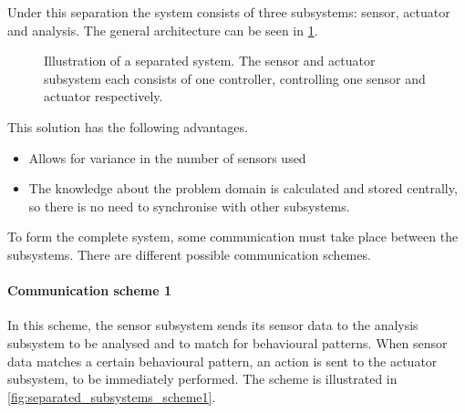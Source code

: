 Under this separation the system consists of three subsystems: sensor, actuator and analysis. The general architecture can be seen in \cref{fig:separated_subsystems}.

\begin{figure}[htbp]
\centering
{}
\caption[Separated system]{Illustration of a separated system. The sensor and actuator subsystem each consists of one controller, controlling one sensor and actuator respectively.}\label{fig:separated_subsystems}
\end{figure}

This solution has the following advantages.

\begin{itemize}
  \item Allows for variance in the number of sensors used
  \item The knowledge about the problem domain is calculated and stored centrally, so there is no need to synchronise with other subsystems.
\end{itemize}

To form the complete system, some communication must take place between the subsystems. There are different possible communication schemes.

\paragraph{Communication scheme 1}

In this scheme, the sensor subsystem sends its sensor data to the analysis subsystem to be analysed and to match for behavioural patterns. When sensor data matches a certain behavioural pattern, an action is sent to the actuator subsystem, to be immediately performed. The scheme is illustrated in \cref{fig:separated_subsystems_scheme1}.

